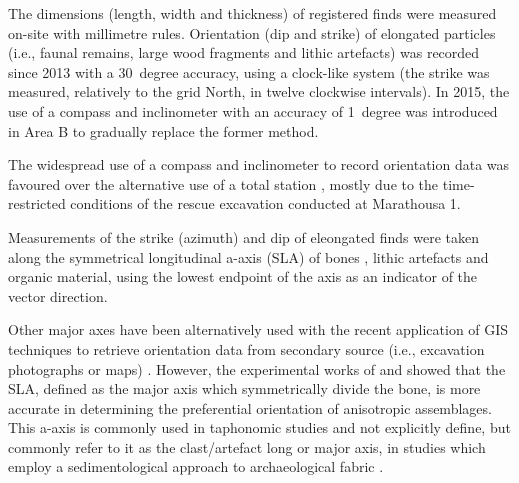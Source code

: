 \documentclass[preprint,authoryear,times]{elsarticle} %
\begin{document}
The dimensions (length, width and thickness) of registered finds were measured on-site with millimetre rules. Orientation (dip and strike) of elongated particles (i.e., faunal remains, large wood fragments and lithic artefacts) was recorded since 2013 with a 30~degree accuracy, using a clock-like system (the strike was measured, relatively to the grid North, in twelve clockwise intervals). In 2015, the use of a compass and inclinometer with an accuracy of 1~degree was introduced in Area B to gradually replace the former method.

The widespread use of a compass and inclinometer to record orientation data \citep[][among others]{Voorhies1966,Bertran1995,Bertran1997,Lenoble2004,Eberth2007,Eren2010,Benito-Calvo2011a,Dominguez-Rodrigo2012,Dominguez-Rodrigo2013,Dominguez-Rodrigo2014,Cobo-Sanchez2014,Organista2017} was favoured over the alternative use of a total station \citep[][among others]{Kluskens1990,Dibble1997,McPherron2005,Enloe2006,Bernatchez2010}, mostly due to the time-restricted conditions of the rescue excavation conducted at Marathousa 1.

Measurements of the strike (azimuth) and dip of eleongated finds were taken along the symmetrical longitudinal a-axis (SLA) of bones \citep{Dominguez-Rodrigo2013}, lithic artefacts \citep{Bertran1995} and organic material, using the lowest endpoint of the axis as an indicator of the vector direction.

Other major axes have been alternatively used with the recent application of GIS techniques to retrieve orientation data from secondary source (i.e., excavation photographs or maps) \citep{Boschian2010,Benito-Calvo2011,Torre2013a,Walter2013,Garcia-Moreno2016,Sanchez-Romero2016}. %
However, the experimental works of \cite{Dominguez-Rodrigo2013} and \cite{Dominguez-Rodrigo2014} showed that the SLA, defined as the major axis which symmetrically divide the bone, is more accurate in determining the preferential orientation of anisotropic assemblages. This a-axis is commonly used in taphonomic studies \citep[][among others]{Toots1965,Voorhies1969,Ebert2007,Dominguez-Rodrigo2012,Dominguez-Rodrigo2014c,Aramendi2017} %
and not explicitly define, but commonly refer to it as the clast/artefact long or major axis, in studies which employ a sedimentological approach to archaeological fabric \citep[][among others]{Bertran1995,Bertran1997,Lenoble2004,Benito-Calvo2009}. %
\end{document}
